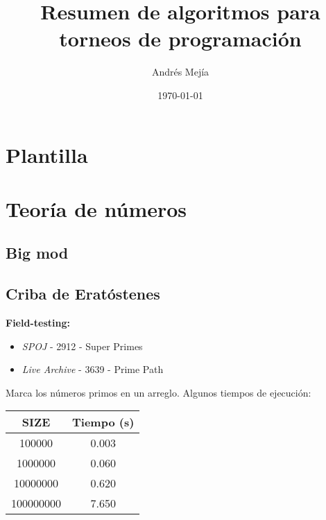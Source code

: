 \documentclass[10pt,letterpaper,twocolumn,twosided]{article}
\newcommand{\codigofuente}[1]{

\dotfill
}
\begin{document}
\title{Resumen de algoritmos para torneos de programación}
\author{Andrés Mejía}
\date{\today}
\maketitle

\tableofcontents
{}
\section{Plantilla}
\codigofuente{./src/template.cpp}
\section{Teoría de números}
\subsection{Big mod}
\codigofuente{./src/number_theory/bigmod.cpp}

\subsection{Criba de Eratóstenes}
\small
\textbf{Field-testing:}
\begin{itemize}
\item \emph{SPOJ} -  2912 - Super Primes
\item \emph{Live Archive} - 3639 - Prime Path
\end{itemize}

\normalsize
Marca los números primos en un arreglo. Algunos tiempos de ejecución:
\begin{center}
  \begin{tabular}{c c}
    \hline\hline
    SIZE & Tiempo (s) \\ [0.5ex]
    \hline
    100000 & 0.003 \\
    1000000 & 0.060 \\
    10000000 & 0.620 \\
    100000000 & 7.650 \\ [1ex]
    \hline
  \end{tabular}
\end{center}
\codigofuente{./src/number_theory/criba.cpp}
\end{document}

